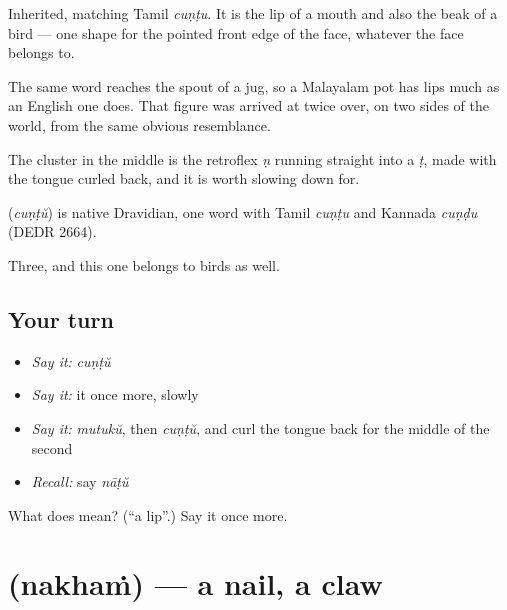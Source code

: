 Inherited, matching Tamil \emph{cuṇṭu}. It is the lip of a mouth and also the beak of a bird — one shape for the pointed front edge of the face, whatever the face belongs to.

The same word reaches the spout of a jug, so a Malayalam pot has lips much as an English one does. That figure was arrived at twice over, on two sides of the world, from the same obvious resemblance.

The  cluster in the middle is the retroflex \emph{ṇ} running straight into a \emph{ṭ}, made with the tongue curled back, and it is worth slowing down for.

\begin{cousinweb}
\textbf{} (\emph{cuṇṭŭ}) is native Dravidian, one word with Tamil \emph{cuṇṭu} and Kannada \emph{cuṇḍu} (DEDR 2664).
\end{cousinweb}

\begin{grammarlens}[title={What you've built}]
Three, and this one belongs to birds as well.
\end{grammarlens}

\subsection*{Your turn}
\begin{itemize}
\raggedright
  \item \emph{Say it:} \emph{cuṇṭŭ}
  \item \emph{Say it:} it once more, slowly
  \item \emph{Say it:} \emph{mutukŭ}, then \emph{cuṇṭŭ}, and curl the tongue back for the middle of the second
  \item \emph{Recall:} say \emph{nāṭŭ}
\end{itemize}

\begin{tcolorbox}[breakable,colback=teal!4,colframe=teal!35!black,title={Before you move on}]
What does  mean? (\textquotedblleft{}a lip\textquotedblright{}.) Say it once more.
\end{tcolorbox}
\section[\texorpdfstring{\ml{നഖം} (nakhaṁ)}{നഖം (nakhaṁ)}]{ (nakhaṁ) — a nail, a claw}

\label{lesson:ML-C57-nail}



